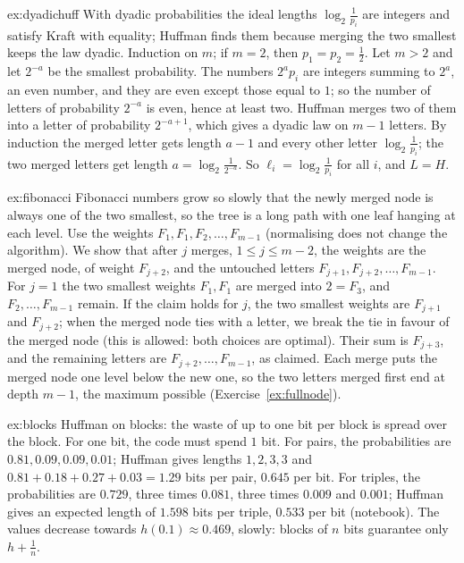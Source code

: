 \begin{solution}{ex:dyadichuff}
\idea With dyadic probabilities the ideal lengths $\log_2\frac1{p_i}$ are integers and satisfy Kraft with equality; Huffman finds them because merging the two smallest keeps the law dyadic.
\writeup Induction on $m$; if $m=2$, then $p_1=p_2=\frac12$. Let $m>2$ and let $2^{-a}$ be the smallest probability. The numbers $2^ap_i$ are integers summing to $2^a$, an even number, and they are even except those equal to $1$; so the number of letters of probability $2^{-a}$ is even, hence at least two. Huffman merges two of them into a letter of probability $2^{-a+1}$, which gives a dyadic law on $m-1$ letters. By induction the merged letter gets length $a-1$ and every other letter $\log_2\frac1{p_i}$; the two merged letters get length $a=\log_2\frac1{2^{-a}}$. So $\ell_i=\log_2\frac1{p_i}$ for all $i$, and $L=H$.
\end{solution}

\begin{solution}{ex:fibonacci}
\idea Fibonacci numbers grow so slowly that the newly merged node is always one of the two smallest, so the tree is a long path with one leaf hanging at each level.
\writeup Use the weights $F_1,F_1,F_2,\dots,F_{m-1}$ (normalising does not change the algorithm). We show that after $j$ merges, $1\le j\le m-2$, the weights are the merged node, of weight $F_{j+2}$, and the untouched letters $F_{j+1},F_{j+2},\dots,F_{m-1}$. For $j=1$ the two smallest weights $F_1,F_1$ are merged into $2=F_3$, and $F_2,\dots,F_{m-1}$ remain. If the claim holds for $j$, the two smallest weights are $F_{j+1}$ and $F_{j+2}$; when the merged node ties with a letter, we break the tie in favour of the merged node (this is allowed: both choices are optimal). Their sum is $F_{j+3}$, and the remaining letters are $F_{j+2},\dots,F_{m-1}$, as claimed. Each merge puts the merged node one level below the new one, so the two letters merged first end at depth $m-1$, the maximum possible (Exercise~\ref{ex:fullnode}).
\end{solution}

\begin{solution}{ex:blocks}
\idea Huffman on blocks: the waste of up to one bit per block is spread over the block.
\writeup For one bit, the code must spend $1$ bit. For pairs, the probabilities are $0.81,0.09,0.09,0.01$; Huffman gives lengths $1,2,3,3$ and $0.81+0.18+0.27+0.03=1.29$ bits per pair, $0.645$ per bit. For triples, the probabilities are $0.729$, three times $0.081$, three times $0.009$ and $0.001$; Huffman gives an expected length of $1.598$ bits per triple, $0.533$ per bit (notebook). The values decrease towards $h(0.1)\approx0.469$, slowly: blocks of $n$ bits guarantee only $h+\frac1n$.
\end{solution}

